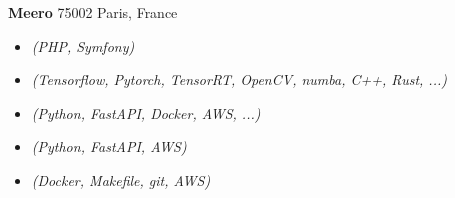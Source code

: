 \documentclass[a4paper]{article}
\newcommand\en[1]{}
\newcommand\fr[1]{}
\begin{document}
    \textbf{Meero}
        \hfill 75002 Paris, France\\
        \en{ \textit{"Backend programmer"} \hfill March 2020 - June 2020\\}
        \fr{ \textit{"Développeur backend"} \hfill mars 2020 - juin 2020\\}
        \vspace{-1mm}
        \begin{itemize} \itemsep 1pt
            \item
                \en{Creation of unit \& functional tests for the Meero platform}
                \fr{Écriture de tests unitaires \& fonctionnels pour la plateform Meero}
                {\sl (PHP, Symfony)}
            \item
                \en{Optimization of image enhancement algorithms written by the R\&D team}
                \fr{Optimisation d’algorithmes d'améliaration d'image écrits par la R\&D}
                {\sl (Tensorflow, Pytorch, TensorRT, OpenCV, numba, C++, Rust, ...)}
            \item
                \en{Integration of algorithms into a micro-services environment}
                \fr{Intégration d’algorithmes dans un système de micro-services}
                {\sl (Python, FastAPI, Docker, AWS, ...)}
            \item
                \en{Work on a custom orchestrator for micro-services}
                \fr{Travail sur un orchestrateur pour gérer les micro-services}
                {\sl (Python, FastAPI, AWS)}
            \item
                \en{Creation of an intuitive and efficient workflow for the R\&D team}
                \fr{Création et mise en place d’un workflow intuitif et efficace pour la R\&D}
                {\sl (Docker, Makefile, git, AWS)}
        \end{itemize}
\end{document}
